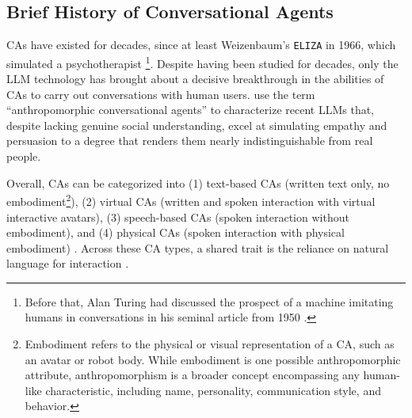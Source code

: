 \documentclass[preprint,review,12pt,authoryear,nonatbib]{elsarticle}
\begin{document}
\subsection{Brief History of Conversational Agents}
CAs have existed for decades, since at least Weizenbaum's \texttt{ELIZA} in 1966, which simulated a psychotherapist \parencite{weizenbaum_elizacomputer_1966}\footnote{Before that, Alan Turing had discussed the prospect of a machine imitating humans in conversations in his seminal article from 1950 \parencite{turing_computing_1950}.}. Despite having been studied for decades, only the LLM technology has brought about a decisive breakthrough in the abilities of CAs to carry out conversations with human users. \textcite{peter_benefits_2025} use the term ``anthropomorphic conversational agents'' to characterize recent LLMs that, despite lacking genuine social understanding, excel at simulating empathy and persuasion to a degree that renders them nearly indistinguishable from real people. %

Overall, %
CAs can be categorized into (1) text-based CAs (written text only, no embodiment\footnote{Embodiment refers to the physical or visual representation of a CA, such as an avatar or robot body. While embodiment is one possible anthropomorphic attribute, anthropomorphism is a broader concept encompassing any human-like characteristic, including name, personality, communication style, and behavior.}), (2) virtual CAs (written and spoken interaction with virtual interactive avatars), (3) speech-based CAs (spoken interaction without embodiment), and (4) physical CAs (spoken interaction with physical embodiment) \parencite{diederich_design_2022}. 
Across these CA types, a shared trait is the reliance on natural language for interaction \parencite{diederich_design_2022}. 
\end{document}
